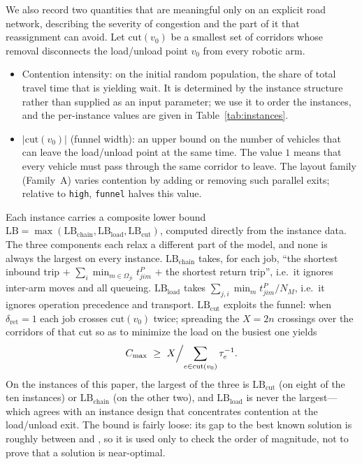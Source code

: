 We also record two quantities that are meaningful only on an explicit road network, describing the severity of congestion and the part of it that reassignment can avoid.
Let $\mathrm{cut}(v_0)$ be a smallest set of corridors whose removal disconnects the load/unload point $v_0$ from every robotic arm.

\begin{itemize}[leftmargin=*,topsep=2pt,itemsep=1pt]
  \item Contention intensity: on the initial random population, the share of total travel time that is yielding wait. It is determined by the instance structure rather than supplied as an input parameter; we use it to order the instances, and the per-instance values are given in Table~\ref{tab:instances}.
  \item $|\mathrm{cut}(v_0)|$ (funnel width): an upper bound on the number of vehicles that can leave the load/unload point at the same time. The value $1$ means that every vehicle must pass through the same corridor to leave. The layout family (Family~A) varies contention by adding or removing such parallel exits; relative to \texttt{high}, \texttt{funnel} halves this value.
\end{itemize}

Each instance carries a composite lower bound
$\mathrm{LB}=\max(\mathrm{LB}_{\text{chain}},\mathrm{LB}_{\text{load}},
\mathrm{LB}_{\text{cut}})$, computed directly from the instance data. The three components each relax a different part of the model, and none is always the largest on every instance.
$\mathrm{LB}_{\text{chain}}$ takes, for each job, ``the shortest inbound trip $+$
$\sum_i \min_{m\in\Omega_{ji}}t^P_{jim}$ $+$ the shortest return trip'', i.e.\ it ignores inter-arm moves and all queueing.
$\mathrm{LB}_{\text{load}}$ takes $\sum_{j,i}\min_m t^P_{jim}/N_M$, i.e.\ it ignores operation precedence and transport.
$\mathrm{LB}_{\text{cut}}$ exploits the funnel: when $\delta_{\mathrm{ret}}=1$ each job crosses
$\mathrm{cut}(v_0)$ twice; spreading the $X=2n$ crossings over the corridors of that cut so as to minimize the load on the busiest one yields
\begin{equation}
\label{eq:lbcut}
C_{\max}\ \ge\ X\Bigl/\sum_{e\in \mathrm{cut}(v_0)}\tau_e^{-1}.
\end{equation}
On the instances of this paper, the largest of the three is $\mathrm{LB}_{\text{cut}}$ (on eight of the ten instances) or
$\mathrm{LB}_{\text{chain}}$ (on the other two), and $\mathrm{LB}_{\text{load}}$ is never the largest---which agrees with an instance design that concentrates contention at the load/unload exit.
The bound is fairly loose: its gap to the best known solution is roughly between \LBGapLo{} and \LBGapHi{}, so it is used only to check the order of magnitude, not to prove that a solution is near-optimal.

